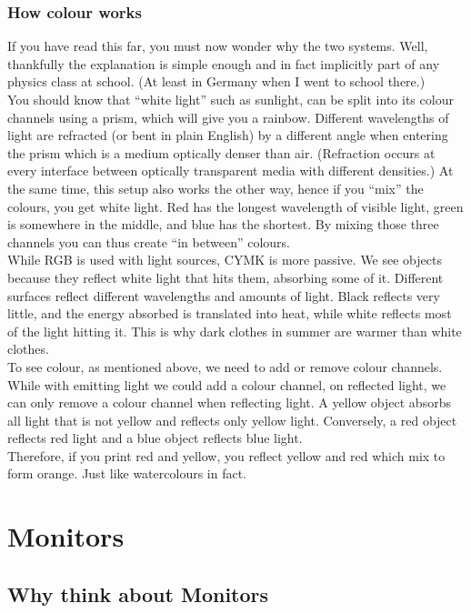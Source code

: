 \subsubsection{How colour works}

If you have read this far, you must now wonder why the two systems. Well, thankfully the explanation is simple enough and in fact implicitly part of any physics class at school. (At least in Germany when I went to school there.)
\\
You should know that ``white light'' such as sunlight, can be split into its colour channels using a prism, which will give you a rainbow. Different wavelengths of light are refracted (or bent in plain English) by a different angle when entering the prism which is a medium optically denser than air. (Refraction occurs at every interface between optically transparent media with different densities.) At the same time, this setup also works the other way, hence if you ``mix'' the colours, you get white light. Red has the longest wavelength of visible light, green is somewhere in the middle, and blue has the shortest. By mixing those three channels you can thus create ``in between'' colours.
\\[\baselineskip]
While RGB is used with light sources, CYMK is more passive. We see objects because they reflect white light that hits them, absorbing some of it. Different surfaces reflect different wavelengths and amounts of light. Black reflects very little, and the energy absorbed is translated into heat, while white reflects most of the light hitting it. This is why dark clothes in summer are warmer than white clothes.
\\
To see colour, as mentioned above, we need to add or remove colour channels. While with emitting light we could add a colour channel, on reflected light, we can only remove a colour channel when reflecting light. A yellow object absorbs all light that is not yellow and reflects only yellow light. Conversely, a red object reflects red light and a blue object reflects blue light.
\\
Therefore, if you print red and yellow, you reflect yellow and red which mix to form orange. Just like watercolours in fact.


\section{Monitors}

\subsection{Why think about Monitors}

